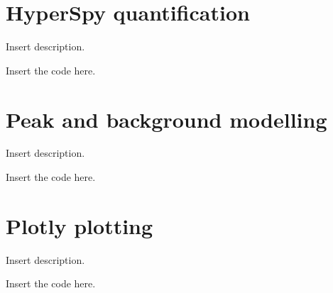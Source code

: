 \chapter{HyperSpy quantification}
\label{appendix:HSquant}

Insert description.

Insert the code here.



\chapter{Peak and background modelling}
\label{appendix:modelling}

Insert description.

Insert the code here.


\chapter{Plotly plotting}
\label{appendix:plotting}

Insert description.

Insert the code here.